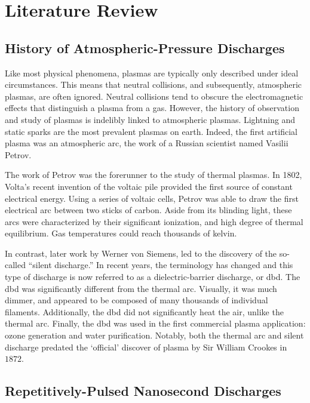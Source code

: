\section{Literature Review}

\subsection{History of Atmospheric-Pressure Discharges}

Like most physical phenomena, plasmas are typically only described under ideal
circumstances. This means that neutral collisions, and subsequently, atmospheric
plasmas, are often ignored. Neutral collisions tend to obscure the
electromagnetic effects that distinguish a plasma from a gas. However, the
history of observation and study of plasmas is indelibly linked to atmospheric
plasmas. Lightning and static sparks are the most prevalent plasmas on earth.
Indeed, the first artificial plasma was an atmospheric arc, the work of a
Russian scientist named Vasilii Petrov.

The work of Petrov was the forerunner to the study of thermal plasmas. In 1802,
Volta's recent invention of the voltaic pile provided the first source of
constant electrical energy. Using a series of voltaic cells, Petrov was able to
draw the first electrical arc between two sticks of carbon. Aside from its
blinding light, these arcs were characterized by their significant ionization,
and high degree of thermal equilibrium. Gas temperatures could reach thousands
of kelvin.

In contrast, later work by Werner von Siemens, led to the discovery of the
so-called ``silent discharge.'' In recent years, the terminology has changed and
this type of discharge is now referred to as a dielectric-barrier discharge, or
\acs{dbd}. The \acs{dbd} was significantly different from the thermal arc.
Visually, it was much dimmer, and appeared to be composed of many thousands of
individual filaments. Additionally, the \acs{dbd} did not significantly heat the
air, unlike the thermal arc. Finally, the \acs{dbd} was used in the first
commercial plasma application: ozone generation and water purification. Notably,
both the thermal arc and silent discharge predated the `official' discover of
plasma by Sir William Crookes in $1872$.


\subsection{Repetitively-Pulsed Nanosecond Discharges}

